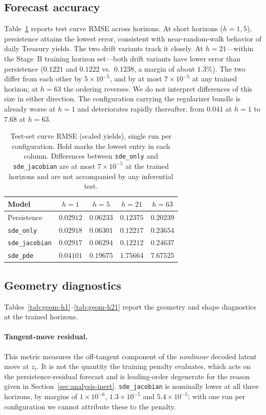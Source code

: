 \documentclass{article} %
\begin{document}
\subsection{Forecast accuracy}
\label{sec:results-rmse}
Table~\ref{tab:curve-rmse} reports test curve RMSE across horizons. At short
horizons ($h{=}1,5$), persistence attains the lowest error, consistent with
near-random-walk behavior of daily Treasury yields. The two drift variants track it
closely.
At $h{=}21$---within the Stage~B training horizon set---both drift variants have
lower error than persistence ($0.1221$ and $0.1222$ vs.\ $0.1238$, a margin of about
$1.3\%$). The two differ from each other by $5\times10^{-5}$, and by at most
$7\times10^{-5}$ at any trained horizon; at $h{=}63$ the ordering reverses. We do not
interpret differences of this size in either direction.
The configuration carrying the regularizer bundle is already worse at $h{=}1$ and
deteriorates rapidly thereafter, from $0.041$ at $h{=}1$ to $7.68$ at $h{=}63$.
\begin{table}[t]
  \centering
  \caption{Test-set curve RMSE (scaled yields), single run per configuration. Bold
  marks the lowest entry in each column. Differences between \texttt{sde\_only} and
  \texttt{sde\_jacobian} are at most $7\times10^{-5}$ at the trained horizons and are
  not accompanied by any inferential test.}
  \label{tab:curve-rmse}
  \begin{tabular}{@{}lcccc@{}}
    \toprule
    Model & $h{=}1$ & $h{=}5$ & $h{=}21$ & $h{=}63$ \\
    \midrule
    Persistence
      & $\mathbf{0.02912}$ & $\mathbf{0.06233}$ & $0.12375$ & $\mathbf{0.20239}$ \\
    \midrule
    \texttt{sde\_only}
      & $0.02918$ & $0.06301$ & $0.12217$ & $0.23654$ \\
    \texttt{sde\_jacobian}
      & $0.02917$ & $0.06294$ & $\mathbf{0.12212}$ & $0.24637$ \\
    \texttt{sde\_pde}
      & $0.04101$ & $0.19675$ & $1.75664$ & $7.67525$ \\
    \bottomrule
  \end{tabular}
\end{table}
\subsection{Geometry diagnostics}
\label{sec:results-geometry}
Tables~\ref{tab:geom-h1}--\ref{tab:geom-h21} report the geometry and shape
diagnostics at the trained horizons.
\paragraph{Tangent-move residual.} This metric measures the off-tangent component of
the \emph{nonlinear} decoded latent move at $z_t$. It is not the quantity the
training penalty evaluates, which acts on the persistence-residual forecast and is
leading-order degenerate for the reason given in
Section~\ref{sec:analysis-inert}.
\texttt{sde\_jacobian} is nominally lower at all three horizons, by margins of
$1\times10^{-6}$, $1.3\times10^{-5}$ and $5.4\times10^{-5}$; with one run per
configuration we cannot attribute these to the penalty.
\end{document}
